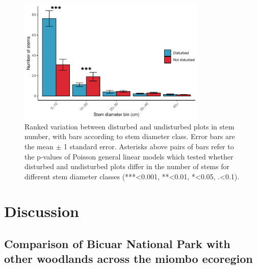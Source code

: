 \begin{refsection}
\begin{landscape}

\end{landscape}

\begin{figure}
	\includegraphics[width=0.8\textwidth]{img/degrad_dbh_bin}
	\caption[Stem diameter class variation among disturbed and undisturbed plots]{Ranked variation between disturbed and undisturbed plots in stem number, with bars according to stem diameter class. Error bars are the mean $\pm$ 1 standard error. Asterisks above pairs of bars refer to the p-values of Poisson general linear models which tested whether disturbed and undisturbed plots differ in the number of stems for different stem diameter classes (***<0.001, **<0.01, *<0.05, .<0.1).}
	\label{bicuar:degrad_dbh_bin}
\end{figure}


\section{Discussion}
\label{bicuar:sec:discussion}

\subsection{Comparison of Bicuar National Park with other woodlands across the miombo ecoregion}
\label{bicuar:ssec:miombo}


\end{refsection}
